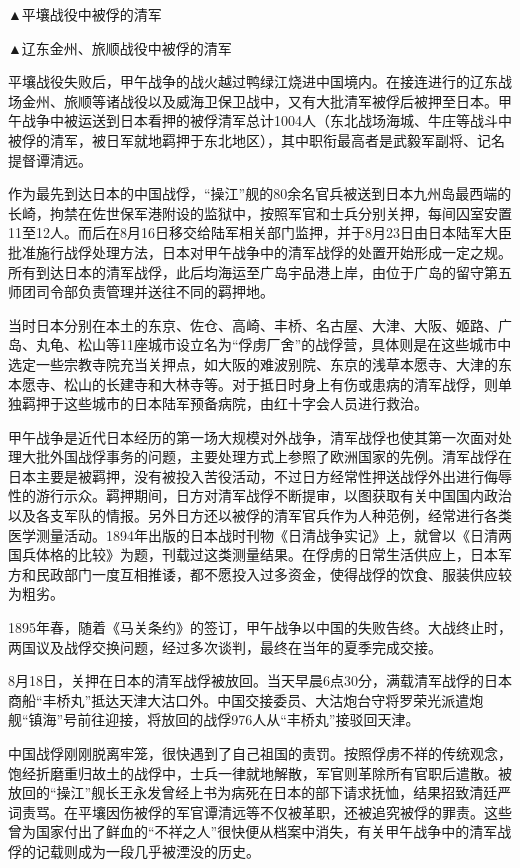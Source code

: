\documentclass[12pt,UTF8]{ctexbook}
\begin{document}
▲平壤战役中被俘的清军


▲辽东金州、旅顺战役中被俘的清军

平壤战役失败后，甲午战争的战火越过鸭绿江烧进中国境内。在接连进行的辽东战场金州、旅顺等诸战役以及威海卫保卫战中，又有大批清军被俘后被押至日本。甲午战争中被运送到日本看押的被俘清军总计1004人（东北战场海城、牛庄等战斗中被俘的清军，被日军就地羁押于东北地区），其中职衔最高者是武毅军副将、记名提督谭清远。

作为最先到达日本的中国战俘，“操江”舰的80余名官兵被送到日本九州岛最西端的长崎，拘禁在佐世保军港附设的监狱中，按照军官和士兵分别关押，每间囚室安置11至12人。而后在8月16日移交给陆军相关部门监押，并于8月23日由日本陆军大臣批准施行战俘处理方法，日本对甲午战争中的清军战俘的处置开始形成一定之规。所有到达日本的清军战俘，此后均海运至广岛宇品港上岸，由位于广岛的留守第五师团司令部负责管理并送往不同的羁押地。

当时日本分别在本土的东京、佐仓、高崎、丰桥、名古屋、大津、大阪、姬路、广岛、丸龟、松山等11座城市设立名为“俘虏厂舍”的战俘营，具体则是在这些城市中选定一些宗教寺院充当关押点，如大阪的难波别院、东京的浅草本愿寺、大津的东本愿寺、松山的长建寺和大林寺等。对于抵日时身上有伤或患病的清军战俘，则单独羁押于这些城市的日本陆军预备病院，由红十字会人员进行救治。

甲午战争是近代日本经历的第一场大规模对外战争，清军战俘也使其第一次面对处理大批外国战俘事务的问题，主要处理方式上参照了欧洲国家的先例。清军战俘在日本主要是被羁押，没有被投入苦役活动，不过日方经常性押送战俘外出进行侮辱性的游行示众。羁押期间，日方对清军战俘不断提审，以图获取有关中国国内政治以及各支军队的情报。另外日方还以被俘的清军官兵作为人种范例，经常进行各类医学测量活动。1894年出版的日本战时刊物《日清战争实记》上，就曾以《日清两国兵体格的比较》为题，刊载过这类测量结果。在俘虏的日常生活供应上，日本军方和民政部门一度互相推诿，都不愿投入过多资金，使得战俘的饮食、服装供应较为粗劣。

1895年春，随着《马关条约》的签订，甲午战争以中国的失败告终。大战终止时，两国议及战俘交换问题，经过多次谈判，最终在当年的夏季完成交接。

8月18日，关押在日本的清军战俘被放回。当天早晨6点30分，满载清军战俘的日本商船“丰桥丸”抵达天津大沽口外。中国交接委员、大沽炮台守将罗荣光派遣炮舰“镇海”号前往迎接，将放回的战俘976人从“丰桥丸”接驳回天津。

中国战俘刚刚脱离牢笼，很快遇到了自己祖国的责罚。按照俘虏不祥的传统观念，饱经折磨重归故土的战俘中，士兵一律就地解散，军官则革除所有官职后遣散。被放回的“操江”舰长王永发曾经上书为病死在日本的部下请求抚恤，结果招致清廷严词责骂。在平壤因伤被俘的军官谭清远等不仅被革职，还被追究被俘的罪责。这些曾为国家付出了鲜血的“不祥之人”很快便从档案中消失，有关甲午战争中的清军战俘的记载则成为一段几乎被湮没的历史。
\end{document}

